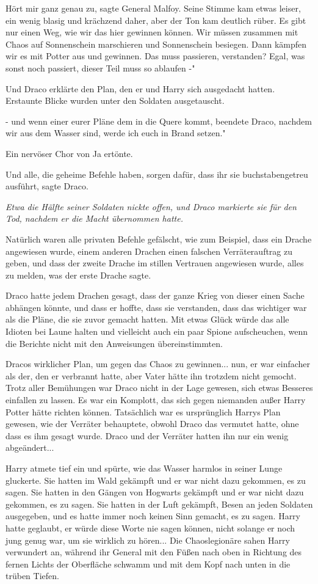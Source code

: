 \glqq Hört mir ganz genau zu\grqq{}, sagte General Malfoy. Seine Stimme kam
etwas leiser, ein wenig blasig und krächzend daher, aber der Ton kam deutlich
rüber. \glqq Es gibt nur einen Weg, wie wir das hier gewinnen können. Wir müssen
zusammen mit Chaos auf Sonnenschein marschieren und Sonnenschein besiegen. Dann
kämpfen wir es mit Potter aus und gewinnen. Das muss passieren, verstanden?
Egal, was sonst noch passiert, dieser Teil muss so ablaufen -"

Und Draco erklärte den Plan, den er und Harry sich ausgedacht hatten. Erstaunte
Blicke wurden unter den Soldaten ausgetauscht.

\glqq - und wenn einer eurer Pläne dem in die Quere kommt\grqq{}, beendete
Draco, \glqq nachdem wir aus dem Wasser sind, werde ich euch in Brand setzen."

Ein nervöser Chor von \glqq Ja\grqq{} ertönte.

\glqq Und alle, die geheime Befehle haben, sorgen dafür, dass ihr sie
buchstabengetreu ausführt\grqq{}, sagte Draco.

\emph{Etwa die Hälfte seiner Soldaten nickte offen, und Draco markierte sie für
den Tod, nachdem er die Macht übernommen hatte.}

Natürlich waren alle privaten Befehle gefälscht, wie zum Beispiel, dass ein
Drache angewiesen wurde, einem anderen Drachen einen falschen Verräterauftrag zu
geben, und dass der zweite Drache im stillen Vertrauen angewiesen wurde, alles
zu melden, was der erste Drache sagte.

Draco hatte jedem Drachen gesagt, dass der ganze Krieg von dieser einen Sache
abhängen könnte, und dass er hoffte, dass sie verstanden, dass das wichtiger war
als die Pläne, die sie zuvor gemacht hatten. Mit etwas Glück würde das alle
Idioten bei Laune halten und vielleicht auch ein paar Spione aufscheuchen, wenn
die Berichte nicht mit den Anweisungen übereinstimmten.

Dracos wirklicher Plan, um gegen das Chaos zu gewinnen... nun, er war einfacher
als der, den er verbrannt hatte, aber Vater hätte ihn trotzdem nicht gemocht.
Trotz aller Bemühungen war Draco nicht in der Lage gewesen, sich etwas Besseres
einfallen zu lassen. Es war ein Komplott, das sich gegen niemanden außer Harry
Potter hätte richten können. Tatsächlich war es ursprünglich Harrys Plan
gewesen, wie der Verräter behauptete, obwohl Draco das vermutet hatte, ohne dass
es ihm gesagt wurde. Draco und der Verräter hatten ihn nur ein wenig
abgeändert...

Harry atmete tief ein und spürte, wie das Wasser harmlos in seiner Lunge
gluckerte. Sie hatten im Wald gekämpft und er war nicht dazu gekommen, es zu
sagen. Sie hatten in den Gängen von Hogwarts gekämpft und er war nicht dazu
gekommen, es zu sagen. Sie hatten in der Luft gekämpft, Besen an jeden Soldaten
ausgegeben, und es hatte immer noch keinen Sinn gemacht, es zu sagen. Harry
hatte geglaubt, er würde diese Worte nie sagen können, nicht solange er noch
jung genug war, um sie wirklich zu hören... Die Chaoslegionäre sahen Harry
verwundert an, während ihr General mit den Füßen nach oben in Richtung des
fernen Lichts der Oberfläche schwamm und mit dem Kopf nach unten in die trüben
Tiefen.

